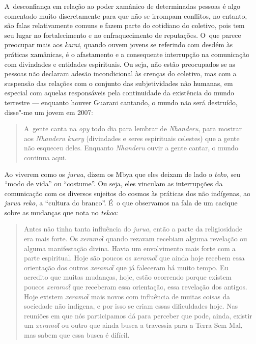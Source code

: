 A~desconfiança em relação ao poder xamânico de determinadas pessoas é
algo comentado muito discretamente para que não se irrompam conflitos,
no entanto, são falas relativamente comuns e fazem parte do cotidiano
do coletivo, pois tem seu lugar no fortalecimento e no enfraquecimento
de reputações. O~que parece preocupar mais aos \emph{karai}, quando ouvem
jovens se referindo com desdém às práticas xamânicas, é o afastamento e
a consequente interrupção na comunicação com divindades e entidades
espirituais. Ou seja, não estão preocupados se as pessoas não declaram
adesão incondicional às crenças do coletivo, mas com a suspensão das
relações com o conjunto das subjetividades não humanas, em especial com
aquelas responsáveis pela continuidade da existência do mundo terrestre
--- enquanto houver Guarani cantando, o mundo não será destruído,
disse"-me um jovem em 2007: 

\begin{quote}
A~gente canta na \emph{opy} todo dia para lembrar de \emph{Nhanderu}, para mostrar aos
\emph{Nhanderu kuery} (divindades e seres espirituais celestes) que a gente
não esqueceu deles. Enquanto \emph{Nhanderu} ouvir a gente cantar, o mundo
continua aqui.
\end{quote}

Ao viverem como os \emph{jurua}, dizem os Mbya que eles deixam de lado o \emph{teko},
seu ``modo de vida'' ou ``costume''. Ou seja, eles vinculam as interrupções
da comunicação com os diversos sujeitos do cosmos às práticas dos não
indígenas, ao \emph{jurua reko}, a ``cultura do branco''. É~o que observamos na
fala de um cacique sobre as mudanças que nota no \emph{tekoa}:

\begin{quote}
Antes não tinha tanta influência do \emph{jurua}, então a parte da
religiosidade era mais forte. Os \emph{xeramoῖ} quando rezavam recebiam
alguma revelação ou alguma manifestação divina. Havia um envolvimento
mais forte com a parte espiritual. Hoje são poucos os \emph{xeramoῖ} que
ainda hoje recebem essa orientação dos outros \emph{xeramoῖ} que já
faleceram há muito tempo. Eu acredito que muitas mudanças, hoje, estão
ocorrendo porque existem poucos \emph{xeramoῖ} que receberam essa
orientação, essa revelação dos antigos. Hoje existem \emph{xeramoῖ} mais
novos com influência de muitas coisas da sociedade não indígena, e por
isso se criam essas dificuldades hoje. Nas reuniões em que nós participamos
dá para perceber que pode, ainda, existir um \emph{xeramoῖ} ou outro que
ainda busca a travessia para a Terra Sem Mal, mas sabem que essa busca é
difícil.
\end{quote}

